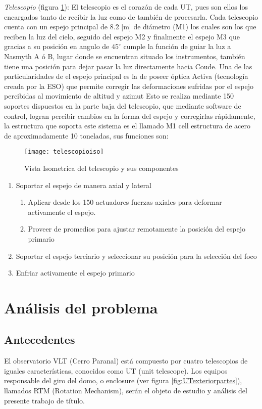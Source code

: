	    	\textit{Telescopio} (figura \ref{fig:telescopioiso}): El telescopio es el corazón de cada UT, pues son ellos los encargados tanto de recibir la luz como de también de procesarla. Cada telescopio cuenta con un espejo principal de 8.2 [m] de diámetro (M1) los cuales son los que reciben la luz del cielo, seguido del espejo M2 y finalmente el espejo M3 que gracias a su posición en angulo de $45^\circ$ cumple la función de guiar la luz a Nasmyth A ó B, lugar donde se encuentran situado los instrumentos, también tiene una posición para dejar pasar la luz directamente hacia Coude. Una de las particularidades de el espejo principal es la de poseer óptica Activa (tecnología creada por la ESO) que permite corregir las deformaciones sufridas por el espejo percibidas al movimiento de altitud y azimut Esto se realiza mediante 150 soportes dispuestos en la parte baja del telescopio, que mediante software de control, logran percibir cambios en la forma del espejo y corregirlas rápidamente, la estructura que soporta este sistema es el llamado M1 cell estructura de acero de aproximadamente 10 toneladas, sus funciones son:
	    	\begin{figure}[H]
				\centering
				\texttt{[image: telescopioiso]}
				\caption{Vista Isometrica del telescopio y sus componentes}
				\label{fig:telescopioiso}
			\end{figure}
			    	
	    	\begin{enumerate}
	    		\item Soportar el espejo de manera axial y lateral
	    		\begin{enumerate}
	    			\item Aplicar desde los 150 actuadores fuerzas axiales para deformar activamente el espejo.
	    			\item Proveer de promedios para ajustar remotamente la posición del espejo primario
	    		\end{enumerate}
    			\item Soportar el espejo terciario y seleccionar su posición para la selección del foco
    			\item Enfriar activamente el espejo primario	    		
	    	\end{enumerate}
	    	
    \section{Análisis del problema}
        \subsection{Antecedentes}
            El observatorio VLT (Cerro Paranal) está compuesto por cuatro telescopios de iguales características, conocidos como UT (unit telescope). Los equipos responsable del giro del domo, o enclosure (ver figura \ref{fig:UTexteriorpartes}), llamados RTM (Rotation Mechanism), serán el objeto de estudio y análisis del presente trabajo de título.
            
